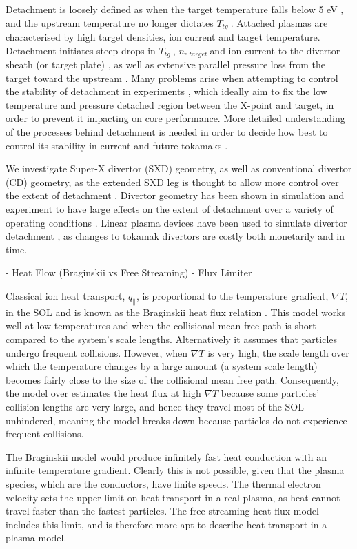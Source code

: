 \documentclass[12pt]{article}  %
\providecommand{\netarget}{$n_{e~target}~$} %
\providecommand{\Ttg}{$T_{tg}~$} %
\newcommand{\citep}[1]{\cite{#1}}
\begin{document}
Detachment is loosely defined as when the target temperature falls below 5 eV \cite{Porter1996}, and the upstream temperature no longer dictates \Ttg. Attached plasmas are characterised by high target densities, ion current and target temperature. Detachment initiates steep drops in \Ttg, \netarget and ion current to the divertor sheath (or target plate) \cite{Stacey2001}, as well as extensive parallel pressure loss from the target toward the upstream \cite{Nakazawa2000}. Many problems arise when attempting to control the stability of detachment in experiments \cite{Lipschultz2016}, which ideally aim to fix the low temperature and pressure detached region between the X-point and target, in order to prevent it impacting on core performance. More detailed understanding of the processes behind detachment is needed in order to decide how best to control its stability in current and future tokamaks \cite{Reimold2015}.

We investigate Super-X divertor (SXD) geometry, as well as conventional divertor (CD) geometry, as the extended SXD leg is thought to allow more control over the extent of detachment \cite{Valanju2009}. Divertor geometry has been shown in simulation and experiment to have large effects on the extent of detachment over a variety of operating conditions \cite{Pitts2001}. Linear plasma devices have been used to simulate divertor detachment \cite{Nishijima2002, Ohno2002}, as changes to tokamak divertors are costly both monetarily and in time.


- Heat Flow (Braginskii vs Free Streaming) - Flux Limiter

Classical ion heat transport, $q_{\parallel}$, is proportional to the temperature gradient, $\nabla T$, in the SOL and is known as the Braginskii heat flux relation \citep{Braginskii1965}. This model works well at low temperatures and when the collisional mean free path is short compared to the system's scale lengths. Alternatively it assumes that particles undergo frequent collisions. However, when $\nabla T$ is very high, the scale length over which the temperature changes by a large amount (a system scale length) becomes fairly close to the size of the collisional mean free path. Consequently, the model over estimates the heat flux at high $\nabla T$ because some particles' collision lengths are very large, and hence they travel most of the SOL unhindered, meaning the model breaks down because particles do not experience frequent collisions.

The Braginskii model would produce infinitely fast heat conduction with an infinite temperature gradient. Clearly this is not possible, given that the plasma species, which are the conductors, have finite speeds. The thermal electron velocity sets the upper limit on heat transport in a real plasma, as heat cannot travel faster than the fastest particles. The free-streaming heat flux model includes this limit, and is therefore more apt to describe heat transport in a plasma model.
\end{document}
